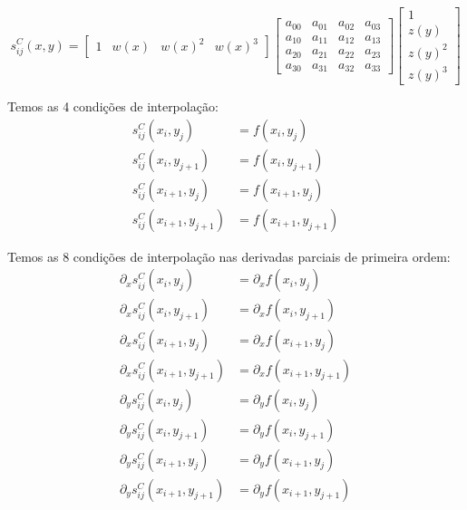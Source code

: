 \documentclass[a4paper, 12pt]{article}
\begin{document}
\[
    s_{ij}^C(x,y) =
\begin{bmatrix}
    1 & w{(x)} & w{(x)}^2 & w{(x)}^3
\end{bmatrix}
\begin{bmatrix}
    a_{00} & a_{01} & a_{02} & a_{03}\\
    a_{10} & a_{11} & a_{12} & a_{13}\\
    a_{20} & a_{21} & a_{22} & a_{23}\\
    a_{30} & a_{31} & a_{32} & a_{33}
\end{bmatrix}
\begin{bmatrix}
    1 \\
    z{(y)} \\
    z{(y)}^2 \\
    z{(y)}^3
\end{bmatrix}
\]

Temos as 4 condições de interpolação:
\begin{align}
    s_{ij}^C(x_i,y_j) &= f(x_i, y_j) \tag{1}\\
    s_{ij}^C(x_i,y_{j + 1}) &= f(x_i, y_{j + 1}) \tag{2}\\
    s_{ij}^C(x_{i + 1},y_j) &= f(x_{i + 1}, y_j) \tag{3} \\
    s_{ij}^C(x_{i + 1},y_{j + 1}) &= f(x_{i + 1}, y_{j + 1}) \tag{4}
\end{align}

Temos as 8 condições de interpolação nas derivadas parciais de primeira ordem:
\begin{align}
    \partial_{x}s_{ij}^C(x_{i}, y_{j})      &= \partial_{x}f(x_{i}, y_{j}) \tag{5}      \\
    \partial_{x}s_{ij}^C(x_{i}, y_{j+1})    &= \partial_{x}f(x_{i}, y_{j+1}) \tag{6}    \\
    \partial_{x}s_{ij}^C(x_{i+1}, y_{j})    &= \partial_{x}f(x_{i+1}, y_{j}) \tag{7}    \\
    \partial_{x}s_{ij}^C(x_{i+1}, y_{j+1})  &= \partial_{x}f(x_{i+1}, y_{j+1}) \tag{8}  \\
    \partial_{y}s_{ij}^C(x_{i}, y_{j})      &= \partial_{y}f(x_{i}, y_{j}) \tag{9}      \\
    \partial_{y}s_{ij}^C(x_{i}, y_{j+1})    &= \partial_{y}f(x_{i}, y_{j+1}) \tag{10}   \\
    \partial_{y}s_{ij}^C(x_{i+1}, y_{j})    &= \partial_{y}f(x_{i+1}, y_{j}) \tag{11}   \\
    \partial_{y}s_{ij}^C(x_{i+1}, y_{j+1})  &= \partial_{y}f(x_{i+1}, y_{j+1}) \tag{12}
\end{align}
\end{document}
